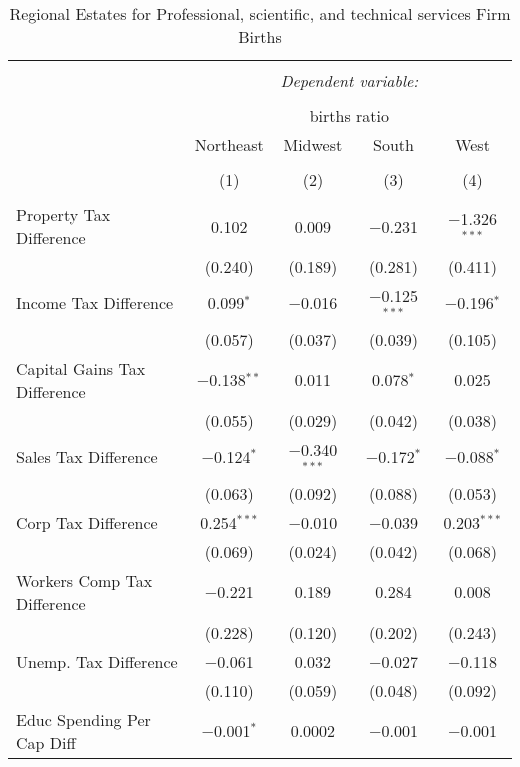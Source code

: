 
\begin{table}[!htbp] \centering 
  \caption{Regional Estates for  Professional, scientific, and technical services Firm Births} 
  \label{} 
\begin{tabular}{@{\extracolsep{5pt}}lcccc} 
\\[-1.8ex]\hline 
\hline \\[-1.8ex] 
 & \multicolumn{4}{c}{\textit{Dependent variable:}} \\ 
\cline{2-5} 
\\[-1.8ex] & \multicolumn{4}{c}{births ratio} \\ 
 & Northeast & Midwest & South & West \\ 
\\[-1.8ex] & (1) & (2) & (3) & (4)\\ 
\hline \\[-1.8ex] 
 Property Tax Difference & 0.102 & 0.009 & $-$0.231 & $-$1.326$^{***}$ \\ 
  & (0.240) & (0.189) & (0.281) & (0.411) \\ 
  Income Tax Difference & 0.099$^{*}$ & $-$0.016 & $-$0.125$^{***}$ & $-$0.196$^{*}$ \\ 
  & (0.057) & (0.037) & (0.039) & (0.105) \\ 
  Capital Gains Tax Difference & $-$0.138$^{**}$ & 0.011 & 0.078$^{*}$ & 0.025 \\ 
  & (0.055) & (0.029) & (0.042) & (0.038) \\ 
  Sales Tax Difference & $-$0.124$^{*}$ & $-$0.340$^{***}$ & $-$0.172$^{*}$ & $-$0.088$^{*}$ \\ 
  & (0.063) & (0.092) & (0.088) & (0.053) \\ 
  Corp Tax Difference & 0.254$^{***}$ & $-$0.010 & $-$0.039 & 0.203$^{***}$ \\ 
  & (0.069) & (0.024) & (0.042) & (0.068) \\ 
  Workers Comp Tax Difference & $-$0.221 & 0.189 & 0.284 & 0.008 \\ 
  & (0.228) & (0.120) & (0.202) & (0.243) \\ 
  Unemp. Tax Difference & $-$0.061 & 0.032 & $-$0.027 & $-$0.118 \\ 
  & (0.110) & (0.059) & (0.048) & (0.092) \\ 
  Educ Spending Per Cap Diff & $-$0.001$^{*}$ & 0.0002 & $-$0.001 & $-$0.001 \\ 

\end{tabular}
\end{table}
